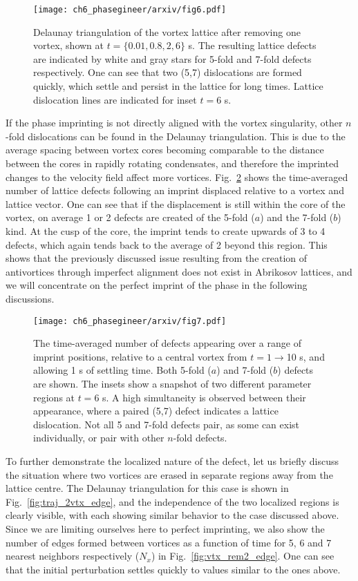 \begin{figure}[h!]\centering
    \texttt{[image: ch6\_phasegineer/arxiv/fig6.pdf]}
    \caption{Delaunay triangulation of the vortex lattice after removing one vortex, shown at $t=\{0.01,0.8,2,6\}$ s. The resulting lattice defects are indicated by white and gray stars for 5-fold and 7-fold defects respectively. One can see that two (5,7) dislocations are formed quickly, which settle and persist in the lattice for long times. Lattice dislocation lines are indicated for inset $t=6$ s.}\label{fig:deltri_1vtx}
\end{figure}

If the phase imprinting is not directly aligned with the vortex singularity, other $n$-fold dislocations can be found in the Delaunay triangulation. This is due to the average spacing between vortex cores becoming comparable to the distance between the cores in rapidly rotating condensates, and therefore the imprinted changes to the velocity field affect more vortices. Fig.~\ref{fig:lattice_misalign} shows the time-averaged number of lattice defects following an imprint displaced relative to a vortex and lattice vector. One can see that if the displacement is still within the core of the vortex, on average 1 or 2 defects are created of the 5-fold ($a$) and the 7-fold ($b$) kind. At the cusp of the core, the imprint tends to create upwards of 3 to 4 defects, which again tends back to the average of 2 beyond this region. This shows that the previously discussed issue resulting from the creation of antivortices through imperfect alignment does not exist in Abrikosov lattices, and we will concentrate on the perfect imprint of the phase in the following discussions.

\begin{figure}[h!]\centering
    \texttt{[image: ch6\_phasegineer/arxiv/fig7.pdf]}
    \caption{The time-averaged number of defects appearing over a range of imprint positions, relative to a central vortex from $t=1\rightarrow$10 s, and allowing 1 s of settling time. Both 5-fold ($a$) and 7-fold ($b$) defects are shown. The insets show a snapshot of two different parameter regions at $t=6$ s. A high simultaneity is observed between their appearance, where a paired (5,7) defect indicates a lattice dislocation. Not all 5 and 7-fold defects pair, as some can exist individually, or pair with other $n$-fold defects.} \label{fig:lattice_misalign}
\end{figure}

To further demonstrate the localized nature of the defect, let us briefly discuss the situation where two vortices are erased in separate regions away from the lattice centre. The Delaunay triangulation for this case is shown in Fig.~\ref{fig:traj_2vtx_edge}, and the independence of the two localized regions is clearly visible, with each  showing similar behavior to the case discussed above. Since we are limiting ourselves here to perfect imprinting, we also show the number of edges formed between vortices as a function of time for 5, 6 and 7 nearest neighbors respectively ($N_x$) in Fig.~\ref{fig:vtx_rem2_edge}. One can see that the initial perturbation settles quickly to values similar to the ones above.

